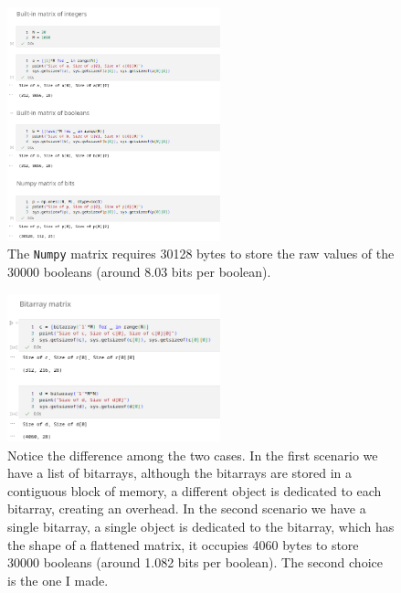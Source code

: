 \documentclass{beamer}
\begin{document}
\begin{frame}
        \begin{figure}
            \centering
            \includegraphics[width=0.55\textwidth]{mem_matrix_1.png}
            \caption{The \texttt{Numpy} matrix requires 30128 bytes to store the raw values of
            the 30000 booleans (around 8.03 bits per boolean).}
            \label{fig:mem_matrix}
        \end{figure}
\end{frame}

\begin{frame}{}
        \begin{figure}
            \centering
            \includegraphics[width=0.55\textwidth]{mem_matrix_2.png}
            \caption{Notice the difference among the two cases. In the first scenario we 
            have a list of bitarrays, although the bitarrays are stored in a contiguous
            block of memory, a different object is dedicated to each bitarray, creating
            an overhead. In the second scenario we have a single bitarray, a single object is
            dedicated to the bitarray, which has the shape of a flattened matrix,
            it occupies 4060 bytes to store 30000 booleans (around 1.082 bits per boolean).
            The second choice is the one I made.}
            \label{fig:mem_matrix_2}
        \end{figure}
\end{frame}
\end{document}

